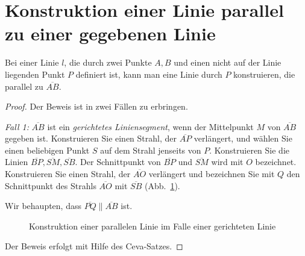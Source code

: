 \section{Konstruktion einer Linie parallel zu einer gegebenen Linie}\label{s.parallel}

\begin{theorem}\label{thm.straight-parallel}
Bei einer Linie $l$, die durch zwei Punkte $A,B$ und einen nicht auf der Linie liegenden Punkt $P$ definiert ist, kann man eine Linie durch $P$ konstruieren, die parallel zu $\overline{AB}$.
\end{theorem}

\begin{proof}

Der Beweis ist in zwei Fällen zu erbringen.

\textit{Fall 1:}
$\overline{AB}$ ist ein \emph{gerichtetes Liniensegment}, wenn der Mittelpunkt $M$ von $\overline{AB}$ gegeben ist.  Konstruieren Sie einen Strahl, der $\overline{AP}$ verlängert, und wählen Sie einen beliebigen Punkt $S$ auf dem Strahl jenseits von $P$. Konstruieren Sie die Linien $\overline{BP}, \overline{SM}, \overline{SB}$. Der Schnittpunkt von $\overline{BP}$ und $\overline{SM}$ wird mit $O$ bezeichnet. Konstruieren Sie einen Strahl, der $\overline{AO}$ verlängert und bezeichnen Sie mit $Q$ den Schnittpunkt des Strahls $\overline{AO}$ mit $\overline{SB}$ (Abb.~\ref{f.se-parallel-directed}).

Wir behaupten, dass $\overline{PQ}\parallel \overline{AB}$ ist. 

\begin{figure}[ht]
\begin{center}
\end{center}
\caption{Konstruktion einer parallelen Linie im Falle einer gerichteten Linie}\label{f.se-parallel-directed}
\end{figure}
Der Beweis erfolgt mit Hilfe des Ceva-Satzes.


\end{proof}
